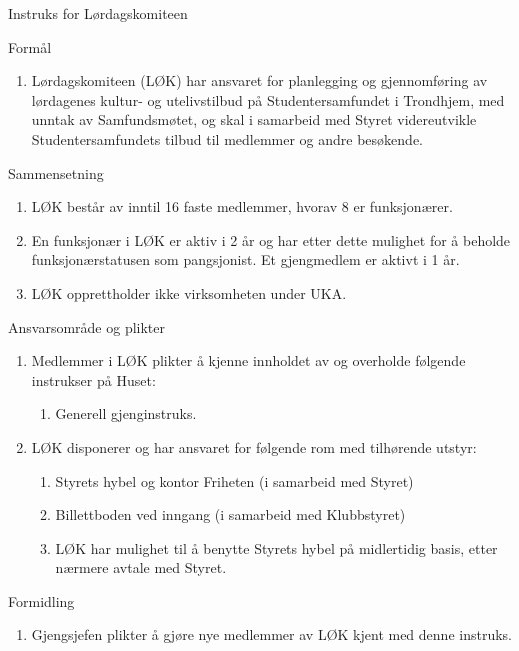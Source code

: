 
\begin{instruks}{Instruks for Lørdagskomiteen}{ }{ }

    \begin{instruksledd}{Formål}
        \begin{enumerate}
            \item Lørdagskomiteen (LØK) har ansvaret for planlegging og gjennomføring av lørdagenes
kultur- og
utelivstilbud på Studentersamfundet i Trondhjem, med unntak av Samfundsmøtet, og skal i samarbeid
med
Styret videreutvikle Studentersamfundets tilbud til medlemmer og andre besøkende.
        \end{enumerate}
    \end{instruksledd}

    \begin{instruksledd}{Sammensetning}
        \begin{enumerate}
            \item LØK består av inntil 16 faste medlemmer, hvorav 8 er funksjonærer.
            \item En funksjonær i LØK er aktiv i 2 år og har etter dette mulighet for å beholde
funksjonærstatusen som
pangsjonist. Et gjengmedlem er aktivt i 1 år.
            \item LØK opprettholder ikke virksomheten under UKA.
        \end{enumerate}
     \end{instruksledd}

     \begin{instruksledd}{Ansvarsområde og plikter}
        \begin{enumerate}
            \item  Medlemmer i LØK plikter å kjenne innholdet av og overholde følgende instrukser på
Huset:
                \begin{enumerate}
                    \item Generell gjenginstruks.
                \end{enumerate}
            \item LØK disponerer og har ansvaret for følgende rom med tilhørende utstyr:
                \begin{enumerate}
                    \item Styrets hybel og kontor Friheten (i samarbeid med Styret)
                    \item Billettboden ved inngang (i samarbeid med Klubbstyret)
                    \item LØK har mulighet til å benytte Styrets hybel på midlertidig basis, etter
nærmere avtale med Styret.
                \end{enumerate}
        \end{enumerate}
    \end{instruksledd}

    \begin{instruksledd}{Formidling}
        \begin{enumerate}
            \item Gjengsjefen plikter å gjøre nye medlemmer av LØK kjent med denne instruks.
        \end{enumerate}
    \end{instruksledd}

\end{instruks}